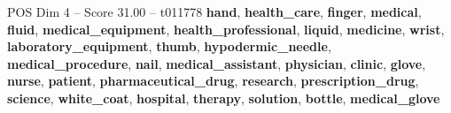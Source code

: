 \begin{textsample}{POS Dim 4 – Score 31.00 – t011778}  \label{ex:f4_pos_008}
\textbf{hand}, \textbf{health\_care}, \textbf{finger}, \textbf{medical}, \textbf{fluid}, \textbf{medical\_equipment}, \textbf{health\_professional}, \textbf{liquid}, \textbf{medicine}, \textbf{wrist}, \textbf{laboratory\_equipment}, \textbf{thumb}, \textbf{hypodermic\_needle}, \textbf{medical\_procedure}, \textbf{nail}, \textbf{medical\_assistant}, \textbf{physician}, \textbf{clinic}, \textbf{glove}, \textbf{nurse}, \textbf{patient}, \textbf{pharmaceutical\_drug}, \textbf{research}, \textbf{prescription\_drug}, \textbf{science}, \textbf{white\_coat}, \textbf{hospital}, \textbf{therapy}, \textbf{solution}, \textbf{bottle}, \textbf{medical\_glove}

\end{textsample}
